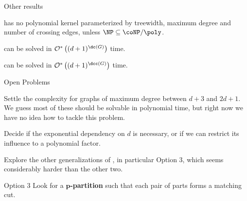 \begin{frame}{Other results}
    \begin{theorem}
         has no polynomial kernel parameterized by treewidth, maximum degree and number of crossing edges, unless $\NP \subseteq \coNP / \poly$.
    \end{theorem}
    \pause
    \begin{theorem}
         can be solved in $\bigOs{(d+1)^{\dc(G)}}$ time.
    \end{theorem}
    \pause
    \begin{theorem}
         can be solved in $\bigOs{(d+1)^{\dcc(G)}}$ time.
    \end{theorem}
\end{frame}

\begin{frame}{Open Problems}
    \begin{block}{}
        Settle the complexity for graphs of maximum degree between $d+3$ and $2d+1$.
        We guess most of these should be solvable in polynomial time, but right now we have no idea how to tackle this problem.
    \end{block}
    \pause
    \begin{block}{}
        Decide if the exponential dependency on $d$ is necessary, or if we can restrict its influence to a polynomial factor.
    \end{block}
    \pause
    \begin{block}{}
        Explore the other generalizations of , in particular Option 3, which seems considerably harder than the other two.
    \end{block}
    \begin{block}{Option 3}
        Look for a \textbf{$\boldsymbol{p}$-partition}  such that each pair of parts forms a matching cut.
    \end{block}
\end{frame}
